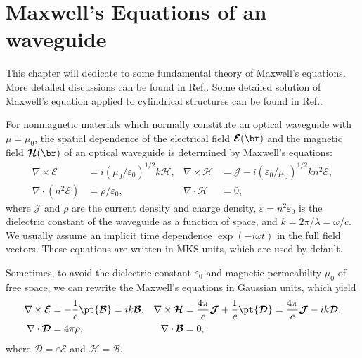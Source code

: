 \chapter{Maxwell's Equations of an waveguide}
This chapter will dedicate to some fundamental theory of Maxwell's equations. More detailed 
discussions can be found in Ref.\cite{Snyder1983}. Some detailed solution of Maxwell's equation 
applied to  cylindrical structures can be found in Ref.\cite{Wait}. 

For nonmagnetic materials which normally constitute an optical waveguide with $ \mu=\mu_0 $, the 
spatial dependence of the electrical field $ \boldsymbol{\mathcal{E}}(\br) $ and the magnetic field $ 
\boldsymbol{\mathcal{H}}(\br) $ of an optical waveguide is determined by Maxwell's equations:
\begin{align}
\nabla\times \boldsymbol{\mathcal{E}} &= i(\mu_0/\varepsilon_0)^{1/2} k \boldsymbol{\mathcal{H}}, & 
\nabla\times \boldsymbol{\mathcal{H}} &= \boldsymbol{\mathcal{J}}-i(\varepsilon_0/\mu_0)^{1/2}kn^2 
\boldsymbol{\mathcal{E}}, \label{EHtimesMKS}\\
\nabla\cdot (n^2 \boldsymbol{\mathcal{E}}) &= \rho/\varepsilon_0, & \nabla\cdot 
\boldsymbol{\mathcal{H}} &=0, \label{EHdotsMKS}
\end{align}
where $ \boldsymbol{\mathcal{J}} $ and $ \rho $ are the current density and charge density, $ 
\varepsilon=n^2 \varepsilon_0 $ is the dielectric constant of the waveguide as a function of space, and $ 
k=2\pi/\lambda=\omega/c $.  We usually assume an implicit time dependence $ \exp(-i\omega t) $ in the 
full field vectors. These equations are written in MKS units, which are used by default. 

Sometimes, to avoid the dielectric constant $ \varepsilon_0 $ and magnetic permeability $ \mu_0 $ of 
free space, we can rewrite the Maxwell's equations in Gaussian units, which yield
\begin{align}
\nabla \times \boldsymbol{\mathcal{E}} &= -\frac{1}{c} \pt{\boldsymbol{\mathcal{B}}}=i 
k\boldsymbol{\mathcal{B}}, & \nabla \times 
\boldsymbol{\mathcal{H}} &= \frac{4\pi}{c} \boldsymbol{\mathcal{J}} + 
\frac{1}{c}\pt{\boldsymbol{\mathcal{D}}}= \frac{4\pi}{c}\boldsymbol{\mathcal{J}} 
-ik\boldsymbol{\mathcal{D}},\\
\nabla \cdot \boldsymbol{\mathcal{D}} &= 4\pi \rho, & \nabla \cdot \boldsymbol{\mathcal{B}} &=0,
\end{align}
where $ \boldsymbol{\mathcal{D}} = \varepsilon \boldsymbol{\mathcal{E}} $ and $ 
\boldsymbol{\mathcal{H}}= \boldsymbol{\mathcal{B}} $. 

